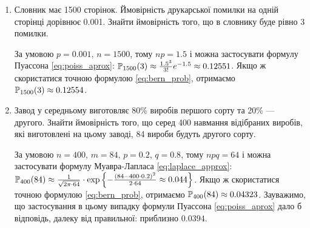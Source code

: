 \begin{example}
    \begin{enumerate}
        \item Словник має 1500 сторінок. Ймовірність друкарської помилки на одній сторінці дорівнює
        0.001. Знайти ймовірність того, що в словнику буде рівно 3 помилки.

        За умовою $p=0.001$, $n=1500$, тому $np = 1.5$ і можна застосувати формулу Пуассона \eqref{eq:poiss_aprox}:
        $\P_{1500}(3) \approx \frac{1.5^3}{3!} e^{-1.5} \approx 0.12551$.
        Якщо ж скористатися точною формулою \eqref{eq:bern_prob}, отримаємо
        $\P_{1500}(3) \approx 0.12554$.
        \item Завод у середньому виготовляє 80\% виробів першого сорту та 20\% --- другого.
        Знайти ймовірність того, що серед 400 навмання відібраних виробів, які виготовлені на цьому заводі,
        84 вироби будуть другого сорту.

        За умовою $n=400$, $m=84$, $p=0.2$, $q=0.8$, тому $npq = 64$ і можна застосувати формулу Муавра-Лапласа \eqref{eq:laplace_approx}:
        $\P_{400}(84) \approx \frac{1}{\sqrt{2\pi \cdot 64}} \cdot \exp\left\{
            -\frac{(84 - 400\cdot0.2)^2}{2\cdot 64} \approx 0.044
        \right\}$. Якщо ж скористатися точною формулою \eqref{eq:bern_prob}, отримаємо
        $\P_{400}(84) \approx 0.04323$. Зауважимо, що застосування в цьому випадку формули Пуассона \eqref{eq:poiss_aprox}
        дало б відповідь, далеку від правильної: приблизно $0.0394$.
    \end{enumerate}
\end{example}